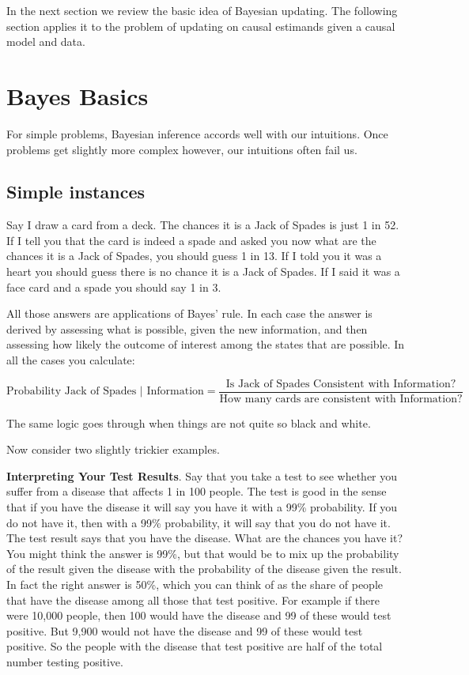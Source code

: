 \documentclass[
  12pt,
]{book}
\begin{document}
In the next section we review the basic idea of Bayesian updating. The following section applies it to the problem of updating on causal estimands given a causal model and data.

\hypertarget{bayes-basics}{%
\section{Bayes Basics}\label{bayes-basics}}

For simple problems, Bayesian inference accords well with our intuitions. Once problems get slightly more complex however, our intuitions often fail us.

\hypertarget{simple-instances}{%
\subsection{Simple instances}\label{simple-instances}}

Say I draw a card from a deck. The chances it is a Jack of Spades is just 1 in 52. If I tell you that the card is indeed a spade and asked you now what are the chances it is a Jack of Spades, you should guess 1 in 13. If I told you it was a heart you should guess there is no chance it is a Jack of Spades. If I said it was a face card and a spade you should say 1 in 3.

All those answers are applications of Bayes' rule. In each case the answer is derived by assessing what is possible, given the new information, and then assessing how likely the outcome of interest among the states that are possible. In all the cases you calculate:

\[\text{Probability Jack of Spades | Information} = \frac{\text{Is Jack of Spades Consistent with Information?}}{\text{How many cards are consistent with Information?}} \]

The same logic goes through when things are not quite so black and white.

Now consider two slightly trickier examples.

\textbf{Interpreting Your Test Results}. Say that you take a test to see whether you suffer from a disease that affects 1 in 100 people. The test is good in the sense that if you have the disease it will say you have it with a 99\% probability. If you do not have it, then with a 99\% probability, it will say that you do not have it. The test result says that you have the disease. What are the chances you have it? You might think the answer is 99\%, but that would be to mix up the probability of the result given the disease with the probability of the disease given the result. In fact the right answer is 50\%, which you can think of as the share of people that have the disease among all those that test positive. For example if there were 10,000 people, then 100 would have the disease and 99 of these would test positive. But 9,900 would not have the disease and 99 of these would test positive. So the people with the disease that test positive are half of the total number testing positive.
\end{document}
